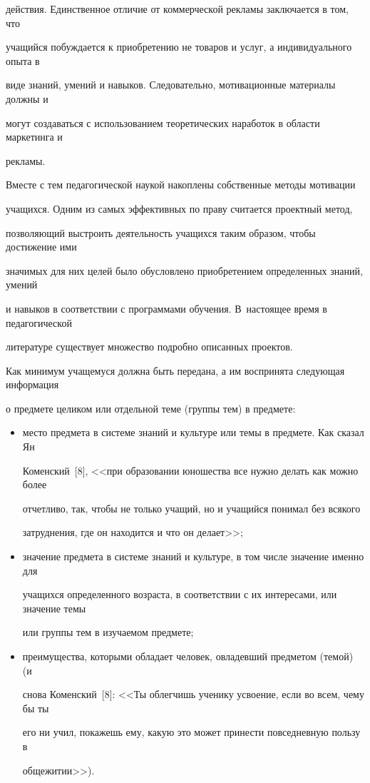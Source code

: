 действия. Единственное отличие от коммерческой рекламы заключается в том, что 


учащийся побуждается к приобретению не товаров и услуг, а индивидуального опыта в 


виде знаний, умений и навыков. Следовательно, мотивационные материалы должны и 


могут создаваться с использованием теоретических наработок в области маркетинга и 


рекламы.





Вместе с тем педагогической наукой накоплены собственные методы мотивации 


учащихся. Одним из самых эффективных по праву считается проектный метод, 


позволяющий выстроить деятельность учащихся таким образом, чтобы достижение ими 


значимых для них целей было обусловлено приобретением определенных знаний, умений 


и навыков в соответствии с программами обучения. В~настоящее время в педагогической 


литературе существует множество подробно описанных проектов.





Как минимум учащемуся должна быть передана, а им воспринята следующая информация 


о предмете целиком или отдельной теме (группы тем) в предмете:


\begin{itemize}


\item место предмета в системе знаний и культуре или темы в предмете. Как сказал Ян 


Коменский~[8], <<при образовании юношества все нужно делать как можно более 


отчетливо, так, чтобы не только учащий, но и учащийся понимал без всякого 


затруднения, где он находится и что он делает>>;


\item значение предмета в системе знаний и культуре, в том числе значение именно для 


учащихся определенного возраста, в соответствии с их интересами, или значение темы 


или группы тем в изучаемом предмете;


\item преимущества, которыми обладает человек, овладевший предметом (темой) (и 


снова Коменский~[8]: <<Ты облегчишь ученику усвоение, если во всем, чему бы ты 


его ни учил, покажешь ему, какую это может принести повседневную пользу в 


общежитии>>).


\end{itemize}





